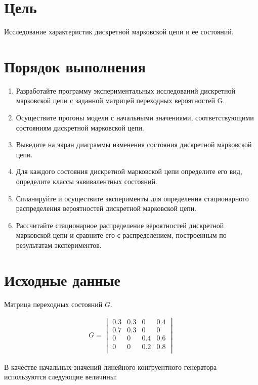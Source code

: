 \section*{Цель}

Исследование характеристик дискретной марковской цепи и ее состояний.

\section*{Порядок выполнения}

\begin{enumerate}
    \item Разработайте программу экспериментальных исследований дискретной марковской цепи с заданной матрицей переходных вероятностей G.
    \item Осуществите прогоны модели с начальными значениями, соответствующими состояниям дискретной марковской цепи.
    \item Выведите на экран диаграммы изменения состояния дискретной марковской цепи.
    \item Для каждого состояния дискретной марковской цепи определите его вид, определите классы эквивалентных состояний.
    \item Спланируйте и осуществите эксперименты для определения стационарного распределения вероятностей дискретной марковской цепи.
    \item Рассчитайте стационарное распределение вероятностей дискретной марковской цепи и сравните его с распределением, построенным по результатам экспериментов.
\end{enumerate}

\section*{Исходные данные}

Матрица переходных состояний $G$.

\begin{align*}
    G=
    \begin{vmatrix}
        0.3&0.3&0&0.4\\
        0.7&0.3&0&0\\
        0&0&0.4&0.6\\
        0&0&0.2&0.8\\
    \end{vmatrix}
\end{align*}

В качестве начальных значений линейного конгруентного генератора используются следующие величины:

